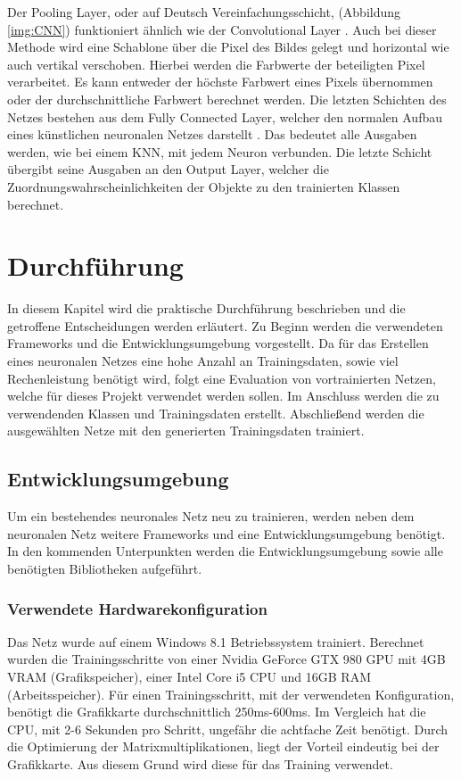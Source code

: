 \documentclass[a4paper,12pt,oneside]{article}
\begin{document}
Der \glqq Pooling Layer\grqq , oder auf Deutsch Vereinfachungsschicht, (Abbildung \ref{img:CNN}) funktioniert ähnlich wie der \glqq Convolutional Layer\grqq{} \cite[336f.]{goodfellow2016deep}. Auch bei dieser Methode wird eine Schablone über die Pixel des Bildes gelegt und horizontal wie auch vertikal verschoben. Hierbei werden die Farbwerte der beteiligten Pixel verarbeitet. Es kann entweder der höchste Farbwert eines Pixels übernommen oder der durchschnittliche Farbwert berechnet werden. Die letzten Schichten des Netzes bestehen aus dem \glqq Fully Connected Layer\grqq , welcher den normalen Aufbau eines künstlichen neuronalen Netzes darstellt \cite[14]{lecun1989backpropagation}. Das bedeutet alle Ausgaben werden, wie bei einem KNN, mit jedem Neuron verbunden. Die letzte Schicht übergibt seine Ausgaben an den Output Layer, welcher die Zuordnungswahrscheinlichkeiten der Objekte zu den trainierten Klassen berechnet.

\newpage

\section{Durchführung}
In diesem Kapitel wird die praktische Durchführung beschrieben und die getroffene Entscheidungen werden erläutert. Zu Beginn werden die verwendeten Frameworks und die Entwicklungsumgebung vorgestellt. Da für das Erstellen eines neuronalen Netzes eine hohe Anzahl an Trainingsdaten, sowie viel Rechenleistung benötigt wird, folgt eine Evaluation von vortrainierten Netzen, welche für dieses Projekt verwendet werden sollen. Im Anschluss werden die zu verwendenden Klassen und Trainingsdaten erstellt. Abschließend werden die ausgewählten Netze mit den generierten Trainingsdaten trainiert.

\subsection{Entwicklungsumgebung}
Um ein bestehendes neuronales Netz neu zu trainieren, werden neben dem neuronalen Netz weitere Frameworks und eine Entwicklungsumgebung benötigt. In den kommenden Unterpunkten werden die Entwicklungsumgebung sowie alle benötigten Bibliotheken aufgeführt. 

\subsubsection{Verwendete Hardwarekonfiguration}
\label{konfiguration}
Das Netz wurde auf einem Windows 8.1 Betriebssystem trainiert. Berechnet wurden die Trainingsschritte von einer Nvidia GeForce GTX 980 GPU mit 4GB VRAM (Grafikspeicher), einer Intel Core i5 CPU und 16GB RAM (Arbeitsspeicher). Für einen Trainingsschritt, mit der verwendeten Konfiguration, benötigt die Grafikkarte durchschnittlich 250ms-600ms. Im Vergleich hat die CPU, mit 2-6 Sekunden pro Schritt, ungefähr die achtfache Zeit benötigt. Durch die Optimierung der Matrixmultiplikationen, liegt der Vorteil eindeutig bei der Grafikkarte. Aus diesem Grund wird diese für das Training verwendet.
\end{document}
